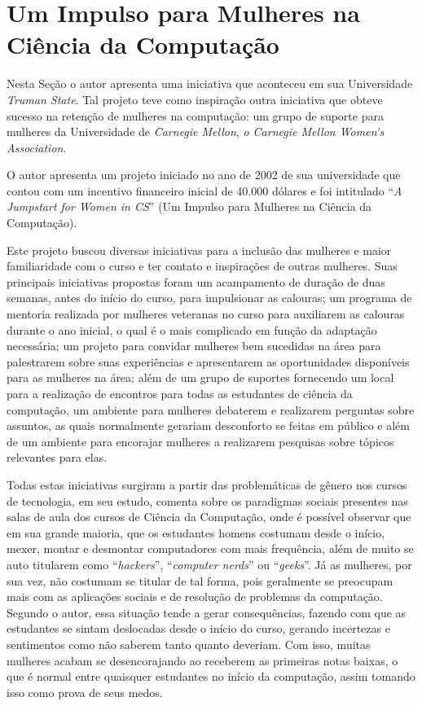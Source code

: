 \section{Um Impulso para Mulheres na Ciência da Computação}\label{sec:impulsoparamulheres}
Nesta Seção o autor  apresenta uma iniciativa que aconteceu em sua Universidade \textit{Truman State}. Tal projeto teve como inspiração outra iniciativa que obteve sucesso na retenção de mulheres na computação: um grupo de suporte para mulheres da Universidade de \textit{Carnegie Mellon}, \textit{o Carnegie Mellon Women’s Association}.

O autor  apresenta um projeto iniciado no ano de 2002 de sua universidade que contou com um incentivo financeiro inicial de 40.000 dólares e foi intitulado “\textit{A Jumpstart for Women in CS}” (Um Impulso para Mulheres na Ciência da Computação). 

Este projeto buscou diversas iniciativas para a inclusão das mulheres e maior familiaridade com o curso e ter contato e inspirações de outras mulheres. Suas principais iniciativas propostas foram um acampamento de duração de duas semanas, antes do início do curso, para impulsionar as calouras; um programa de mentoria realizada por mulheres veteranas no curso para auxiliarem as calouras durante o ano inicial, o qual é o mais complicado em função da adaptação necessária; um projeto para convidar mulheres bem sucedidas na área para palestrarem sobre suas experiências e apresentarem as oportunidades disponíveis para as mulheres na área; além de um grupo de suportes fornecendo um local para a realização de encontros para todas as estudantes de ciência da computação, um ambiente para mulheres debaterem e realizarem perguntas sobre assuntos, as quais normalmente gerariam desconforto se feitas em público e além de um ambiente para encorajar mulheres a realizarem pesquisas sobre tópicos relevantes para elas.

Todas estas iniciativas surgiram a partir das problemáticas de gênero nos cursos de tecnologia,  em seu estudo, comenta sobre os paradigmas sociais presentes nas salas de aula dos cursos de Ciência da Computação, onde é possível observar que em sua grande maioria, que os estudantes homens costumam desde o início, mexer, montar e desmontar computadores com mais frequência, além de muito se auto titularem como “\textit{hackers}”, “\textit{computer nerds}” ou “\textit{geeks}”. Já as mulheres, por sua vez, não costumam se titular de tal forma, pois geralmente se preocupam mais com as aplicações sociais e de resolução de problemas da computação. Segundo o autor, essa situação tende a gerar consequências, fazendo com que as estudantes se sintam deslocadas desde o início do curso, gerando incertezas e sentimentos como não saberem tanto quanto deveriam. Com isso, muitas mulheres acabam se desencorajando ao receberem as primeiras notas baixas, o que é normal entre quaisquer estudantes no início da computação, assim tomando isso como prova de seus medos.

